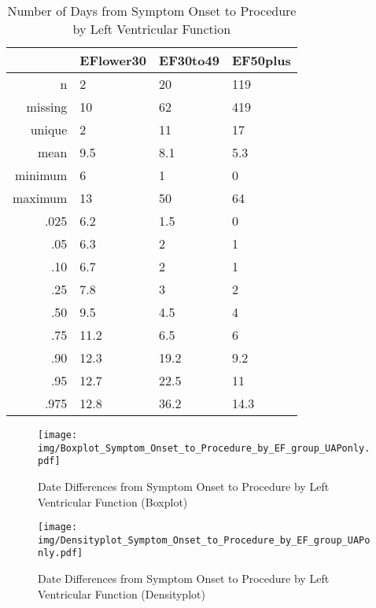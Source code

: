 \documentclass[a4paper]{report}
\begin{document}
\begin{itemize}
{%
\begin{table}[ht]
\centering
\begin{tabular}{rlll}
  \toprule
 & EFlower30 & EF30to49 & EF50plus \\ 
  \midrule
n & 2 & 20 & 119 \\ 
  missing & 10 & 62 & 419 \\ 
  unique & 2 & 11 & 17 \\ 
  mean & 9.5 & 8.1 & 5.3 \\ 
  minimum & 6 & 1 & 0 \\ 
  maximum & 13 & 50 & 64 \\ 
  .025 & 6.2 & 1.5 & 0 \\ 
  .05 & 6.3 & 2 & 1 \\ 
  .10 & 6.7 & 2 & 1 \\ 
  .25 & 7.8 & 3 & 2 \\ 
  .50 & 9.5 & 4.5 & 4 \\ 
  .75 & 11.2 & 6.5 & 6 \\ 
  .90 & 12.3 & 19.2 & 9.2 \\ 
  .95 & 12.7 & 22.5 & 11 \\ 
  .975 & 12.8 & 36.2 & 14.3 \\ 
   \bottomrule
\end{tabular}
\caption{Number of Days from Symptom Onset to Procedure by Left Ventricular Function} 
\end{table}
\begin{figure}
  \centering
  \caption{Date Differences from Symptom Onset to Procedure by Left Ventricular Function (Boxplot)}
  \label{Boxplot: Date Differences from Symptom Onset to Procedure by Left Ventricular Function}
\texttt{[image: img/Boxplot\_Symptom\_Onset\_to\_Procedure\_by\_EF\_group\_UAPonly.pdf]}\end{figure}


\begin{figure}
  \centering
  \caption{Date Differences from Symptom Onset to Procedure by Left Ventricular Function (Densityplot)}
  \label{Density: Date Differences from Symptom Onset to Procedure by Left Ventricular Function}
\texttt{[image: img/Densityplot\_Symptom\_Onset\_to\_Procedure\_by\_EF\_group\_UAPonly.pdf]}\end{figure}


\clearpage

}
\end{itemize}
\end{document}
